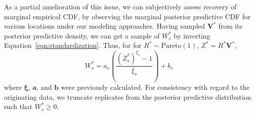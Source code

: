 As a partial amelioration of this issue, we can subjectively assess recovery of marginal 
    empirical CDF, by observing the marginal posterior predictive CDF for various locations
    under our modeling approaches. Having sampled $\bm{V}^{*}$ from its posterior predictive 
    density, we can get a sample of $W_s^*$ by inverting Equation~\eqref{eqn:standardization}.  
    Thus, for for $R^*\sim\text{Pareto}(1)$, $Z^* = R^*\bm{V}^*$,
    \begin{equation*}
        W_s^* = a_s\left(\frac{(Z_s^*)^{\xi_s} - 1}{\xi_s}\right) + b_s
    \end{equation*}
    where $\bm{\xi}$, $\bm{a}$, and $\bm{b}$ were previously calculated.  
    For consistency with regard to the originating data, we truncate replicates from the 
    posterior predictive distribution such that $W_{s}^* \geq 0$.


